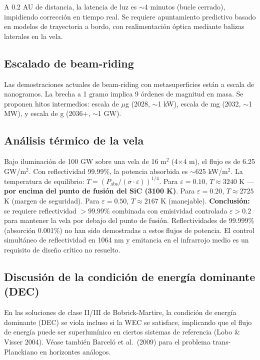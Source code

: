 \documentclass[11pt,a4paper,onecolumn]{article}
\begin{document}
A 0.2 AU de distancia, la latencia de luz es $\sim$4 minutos (bucle cerrado), impidiendo corrección en tiempo real. Se requiere apuntamiento predictivo basado en modelos de trayectoria a bordo, con realimentación óptica mediante balizas laterales en la vela.

\subsection{Escalado de beam-riding}

Las demostraciones actuales de beam-riding con metasuperficies están a escala de nanogramos. La brecha a 1 gramo implica 9 órdenes de magnitud en masa. Se proponen hitos intermedios: escala de $\mu$g (2028, $\sim$1 kW), escala de mg (2032, $\sim$1 MW), y escala de g (2036+, $\sim$1 GW).

\subsection{Análisis térmico de la vela}

Bajo iluminación de 100 GW sobre una vela de 16 m$^2$ (4$\times$4 m), el flujo es de 6.25 GW/m$^2$. Con reflectividad 99.99\%, la potencia absorbida es $\sim$625 kW/m$^2$. La temperatura de equilibrio: $T = (P_{\text{abs}}/(\sigma\cdot\varepsilon))^{1/4}$. Para $\varepsilon = 0.10$, $T \approx 3240$ K — \textbf{por encima del punto de fusión del SiC (3100 K)}. Para $\varepsilon = 0.20$, $T \approx 2725$ K (margen de seguridad). Para $\varepsilon = 0.50$, $T \approx 2167$ K (manejable). \textbf{Conclusión:} se requiere reflectividad $>99.99\%$ combinada con emisividad controlada $\varepsilon > 0.2$ para mantener la vela por debajo del punto de fusión. Reflectividades de 99.999\% (absorción 0.001\%) no han sido demostradas a estos flujos de potencia. El control simultáneo de reflectividad en 1064 nm y emitancia en el infrarrojo medio es un requisito de diseño crítico no resuelto.

\subsection{Discusión de la condición de energía dominante (DEC)}

En las soluciones de clase II/III de Bobrick-Martire, la condición de energía dominante (DEC) se viola incluso si la WEC se satisface, implicando que el flujo de energía puede ser superlumínico en ciertos sistemas de referencia (Lobo \& Visser 2004). Véase también Barceló et al.\ (2009) para el problema trans-Planckiano en horizontes análogos.
\end{document}
